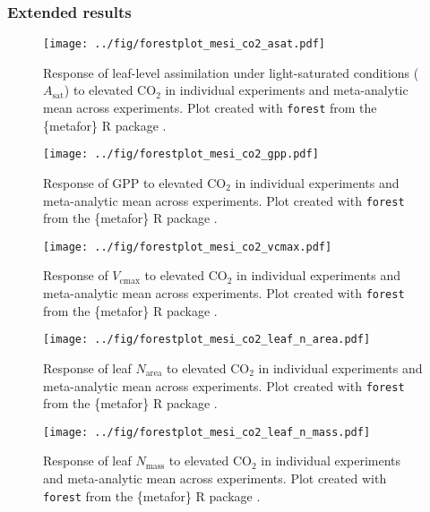 \documentclass{myreport}
\begin{document}
\subsubsection{Extended results}

\begin{figure}[h]
\centering
\texttt{[image: ../fig/forestplot\_mesi\_co2\_asat.pdf]}
\caption{Response of leaf-level assimilation under light-saturated conditions ($A_\text{sat}$) to elevated CO$_2$ in individual experiments and meta-analytic mean across experiments. Plot created with \texttt{forest} from the \{metafor\} R package \cite{viechtbauer_conducting_2010}.}
\end{figure}

% 

\begin{figure}[h]
\centering
\texttt{[image: ../fig/forestplot\_mesi\_co2\_gpp.pdf]}
\caption{Response of GPP to elevated CO$_2$ in individual experiments and meta-analytic mean across experiments. Plot created with \texttt{forest} from the \{metafor\} R package \cite{viechtbauer_conducting_2010}.}
\end{figure}

\begin{figure}[h]
\centering
\texttt{[image: ../fig/forestplot\_mesi\_co2\_vcmax.pdf]}
\caption{Response of $V_\text{cmax}$ to elevated CO$_2$ in individual experiments and meta-analytic mean across experiments. Plot created with \texttt{forest} from the \{metafor\} R package \cite{viechtbauer_conducting_2010}.}
\end{figure}

\begin{figure}[h]
\centering
\texttt{[image: ../fig/forestplot\_mesi\_co2\_leaf\_n\_area.pdf]}
\caption{Response of leaf $N_\text{area}$ to elevated CO$_2$ in individual experiments and meta-analytic mean across experiments. Plot created with \texttt{forest} from the \{metafor\} R package \cite{viechtbauer_conducting_2010}.}
\end{figure}

\begin{figure}[h]
\centering
\texttt{[image: ../fig/forestplot\_mesi\_co2\_leaf\_n\_mass.pdf]}
\caption{Response of leaf $N_\text{mass}$ to elevated CO$_2$ in individual experiments and meta-analytic mean across experiments. Plot created with \texttt{forest} from the \{metafor\} R package \cite{viechtbauer_conducting_2010}.}
\end{figure}
\end{document}
